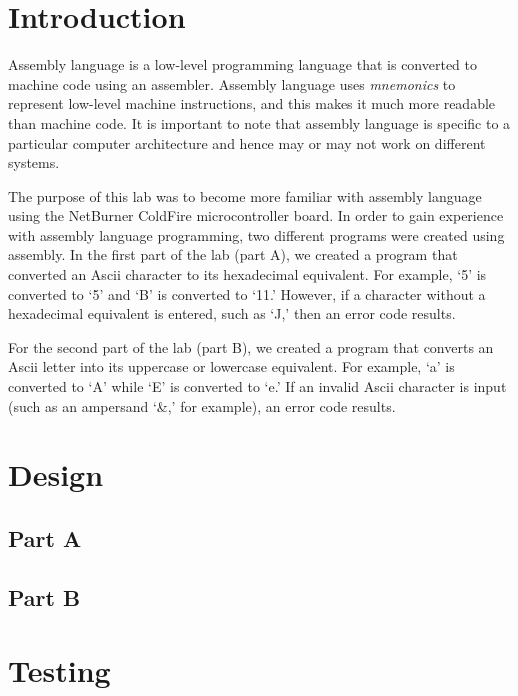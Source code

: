 \documentclass[10pt, letterpaper, titlepage]{article} %
\title{\textbf{\Huge{
\begin{center}
Introduction to\\ Assembly Language\\
\end{center}
}}}
\author{Benjamin Kong | 1573684\\Lora Ma |||| 1570935\\ \\ECE 212 Lab Section H11}
\begin{document}
 
\maketitle 
\thispagestyle{empty}
\tableofcontents 
\newpage
{}

\begin{multicols*}{2}

\section{Introduction}
Assembly language is a low-level programming language that is converted to machine code using an assembler. 
Assembly language uses \textit{mnemonics} to represent low-level machine instructions, and this makes it much more readable than machine code.
It is important to note that assembly language is specific to a particular computer architecture and hence may or may not work on different systems.

The purpose of this lab was to become more familiar with assembly language using the NetBurner ColdFire microcontroller board. 
In order to gain experience with assembly language programming, two different programs were created using assembly. 
In the first part of the lab (part A), we created a program that converted an Ascii character to its hexadecimal equivalent. 
For example, `5' is converted to `5' and `B' is converted to `11.'
However, if a character without a hexadecimal equivalent is entered, such as `J,' then an error code results.

For the second part of the lab (part B), we created a program that converts an Ascii letter into its uppercase or lowercase equivalent.
For example, `a' is converted to `A' while `E' is converted to `e.'
If an invalid Ascii character is input (such as an ampersand `\&,' for example), an error code results.


\section{Design}
\subsection{Part A}

\subsection{Part B}


\section{Testing}

\end{multicols*}
\end{document}
